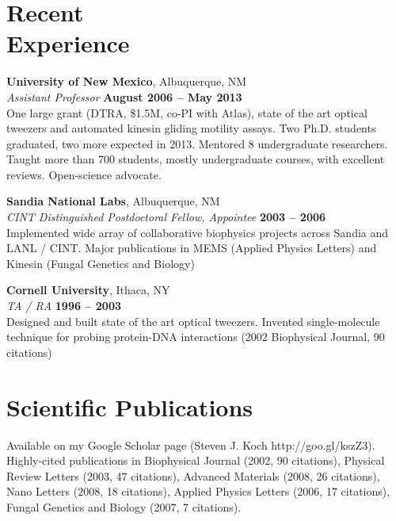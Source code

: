 \documentclass[margin,line]{resume}
\begin{document}
\begin{resume}
    \section{\mysidestyle Recent\\Experience}

    \textbf{University of New Mexico}, Albuquerque, NM \vspace{2mm}\\\vspace{1mm}%
    \textsl{Assistant Professor} \hfill \textbf{August 2006 -- May 2013}\\
    One large grant (DTRA, \$1.5M, co-PI with Atlas), state of the art optical tweezers and automated kinesin gliding motility assays. Two Ph.D. students graduated, two more expected in 2013. Mentored 8 undergraduate researchers. Taught more than 700 students, mostly undergraduate courses, with excellent reviews.  Open-science advocate.

    \textbf{Sandia National Labs}, Albuquerque, NM \vspace{2mm}\\\vspace{1mm}%
    \textsl{CINT Distinguished Postdoctoral Fellow, Appointee} \hfill \textbf{2003 -- 2006}\\
    Implemented wide array of collaborative biophysics projects across Sandia and LANL / CINT.  Major publications in MEMS (Applied Physics Letters) and Kinesin (Fungal Genetics and Biology)

    \textbf{Cornell University}, Ithaca, NY \vspace{2mm}\\\vspace{1mm}%
    \textsl{TA / RA} \hfill \textbf{1996 -- 2003}\\
    Designed and built state of the art optical tweezers. Invented single-molecule technique for probing protein-DNA interactions (2002 Biophysical Journal, 90 citations)
    
    
    \section{\mysidestyle Scientific Publications}
    
    Available on my Google Scholar page (Steven J. Koch http://goo.gl/kszZ3).  Highly-cited publications in Biophysical Journal (2002, 90 citations), Physical Review Letters (2003, 47 citations), Advanced Materials (2008, 26 citations), Nano Letters (2008, 18 citations), Applied Physics Letters (2006, 17 citations), Fungal Genetics and Biology (2007, 7 citations).
    

\end{resume}
\end{document}
